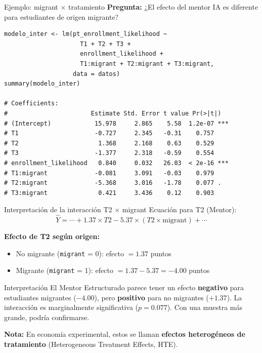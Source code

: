 \documentclass[aspectratio=169, 11pt]{beamer}
\begin{document}
\begin{frame}[fragile]{Ejemplo: migrant $\times$ tratamiento}
\textbf{Pregunta:} ¿El efecto del mentor IA es diferente para estudiantes de origen migrante?

\begin{lstlisting}[basicstyle=\ttfamily\scriptsize]
modelo_inter <- lm(pt_enrollment_likelihood ~
                     T1 + T2 + T3 +
                     enrollment_likelihood +
                     T1:migrant + T2:migrant + T3:migrant,
                   data = datos)
summary(modelo_inter)

# Coefficients:
#                       Estimate Std. Error t value Pr(>|t|)
# (Intercept)            15.978     2.865    5.58  1.2e-07 ***
# T1                     -0.727     2.345   -0.31    0.757
# T2                      1.368     2.168    0.63    0.529
# T3                     -1.377     2.318   -0.59    0.554
# enrollment_likelihood   0.840     0.032   26.03  < 2e-16 ***
# T1:migrant             -0.081     3.091   -0.03    0.979
# T2:migrant             -5.368     3.016   -1.78    0.077 .
# T3:migrant              0.421     3.436    0.12    0.903
\end{lstlisting}
\end{frame}

\begin{frame}{Interpretación de la interacción T2 $\times$ migrant}
Ecuación para T2 (Mentor):
\[
\hat{Y} = \cdots + 1.37 \times T2 - 5.37 \times (T2 \times \text{migrant}) + \cdots
\]

\vspace{0.2cm}
\textbf{Efecto de T2 según origen:}
\begin{itemize}
  \item No migrante (\texttt{migrant} = 0): efecto $= 1.37$ puntos
  \item Migrante (\texttt{migrant} = 1): efecto $= 1.37 - 5.37 = \mathbf{-4.00}$ puntos
\end{itemize}

\vspace{0.2cm}
\begin{alertblock}{Interpretación}
El Mentor Estructurado parece tener un efecto \textbf{negativo} para estudiantes migrantes ($-4.00$), pero \textbf{positivo} para no migrantes ($+1.37$). La interacción es marginalmente significativa ($p = 0.077$). Con una muestra más grande, podría confirmarse.
\end{alertblock}

\vspace{0.2cm}
{\small \textbf{Nota:} En economía experimental, estos se llaman \textbf{efectos heterogéneos de tratamiento} (Heterogeneous Treatment Effects, HTE).}
\end{frame}
\end{document}
